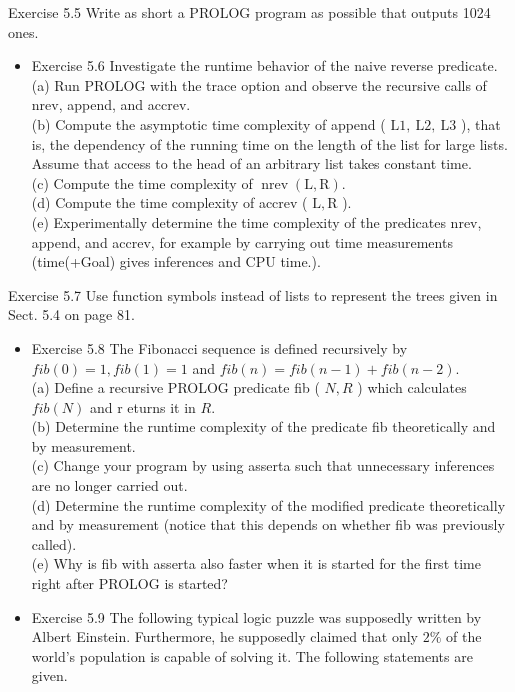 \documentclass[10pt]{article}
\begin{document}
Exercise 5.5 Write as short a PROLOG program as possible that outputs 1024 ones.

\begin{itemize}
  \item Exercise 5.6 Investigate the runtime behavior of the naive reverse predicate.\\
(a) Run PROLOG with the trace option and observe the recursive calls of nrev, append, and accrev.\\
(b) Compute the asymptotic time complexity of append ( $\mathrm{L} 1, \mathrm{~L} 2, \mathrm{~L} 3$ ), that is, the dependency of the running time on the length of the list for large lists. Assume that access to the head of an arbitrary list takes constant time.\\
(c) Compute the time complexity of $\operatorname{nrev}(\mathrm{L}, \mathrm{R})$.\\
(d) Compute the time complexity of accrev ( $\mathrm{L}, \mathrm{R}$ ).\\
(e) Experimentally determine the time complexity of the predicates nrev, append, and accrev, for example by carrying out time measurements (time(+Goal) gives inferences and CPU time.).
\end{itemize}

Exercise 5.7 Use function symbols instead of lists to represent the trees given in Sect. 5.4 on page 81.

\begin{itemize}
  \item Exercise 5.8 The Fibonacci sequence is defined recursively by $f i b(0)=1, f i b(1)=1$ and $f i b(n)=f i b(n-1)+f i b(n-2)$.\\
(a) Define a recursive PROLOG predicate fib ( $N, R$ ) which calculates $f i b(N)$ and r
eturns it in $R$.\\
(b) Determine the runtime complexity of the predicate fib theoretically and by measurement.\\
(c) Change your program by using asserta such that unnecessary inferences are no longer carried out.\\
(d) Determine the runtime complexity of the modified predicate theoretically and by measurement (notice that this depends on whether fib was previously called).\\
(e) Why is fib with asserta also faster when it is started for the first time right after PROLOG is started?
  \item Exercise 5.9 The following typical logic puzzle was supposedly written by Albert Einstein. Furthermore, he supposedly claimed that only $2 \%$ of the world's population is capable of solving it. The following statements are given.
\end{itemize}
\end{document}
